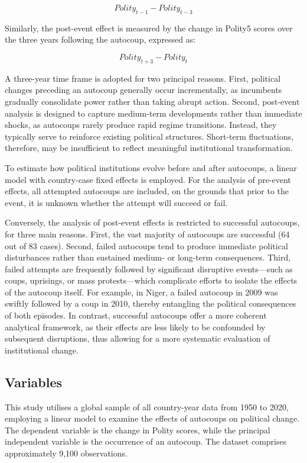 \documentclass[
  12pt,
]{report}
\begin{document}
\[
Polity_{t-1} - Polity_{t-3}
\]

Similarly, the post-event effect is measured by the change in Polity5
scores over the three years following the autocoup, expressed as:

\[
Polity_{t+3} - Polity_t
\]

A three-year time frame is adopted for two principal reasons. First,
political changes preceding an autocoup generally occur incrementally,
as incumbents gradually consolidate power rather than taking abrupt
action. Second, post-event analysis is designed to capture medium-term
developments rather than immediate shocks, as autocoups rarely produce
rapid regime transitions. Instead, they typically serve to reinforce
existing political structures. Short-term fluctuations, therefore, may
be insufficient to reflect meaningful institutional transformation.

To estimate how political institutions evolve before and after
autocoups, a linear model with country-case fixed effects is employed.
For the analysis of pre-event effects, all attempted autocoups are
included, on the grounds that prior to the event, it is unknown whether
the attempt will succeed or fail.

Conversely, the analysis of post-event effects is restricted to
successful autocoups, for three main reasons. First, the vast majority
of autocoups are successful (64 out of 83 cases). Second, failed
autocoups tend to produce immediate political disturbances rather than
sustained medium- or long-term consequences. Third, failed attempts are
frequently followed by significant disruptive events---such as coups,
uprisings, or mass protests---which complicate efforts to isolate the
effects of the autocoup itself. For example, in Niger, a failed autocoup
in 2009 was swiftly followed by a coup in 2010, thereby entangling the
political consequences of both episodes. In contrast, successful
autocoups offer a more coherent analytical framework, as their effects
are less likely to be confounded by subsequent disruptions, thus
allowing for a more systematic evaluation of institutional change.

\subsection{Variables}\label{variables}

This study utilises a global sample of all country-year data from 1950
to 2020, employing a linear model to examine the effects of autocoups on
political change. The dependent variable is the change in Polity scores,
while the principal independent variable is the occurrence of an
autocoup. The dataset comprises approximately 9,100 observations.
\end{document}
